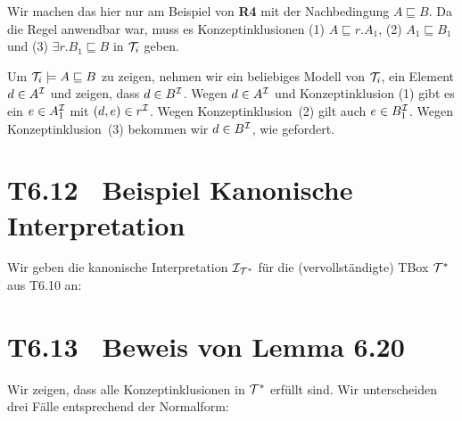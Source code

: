\documentclass[fontsize=11pt, twoside=false, numbers=autoenddot]{scrbook}
\begin{document}
Wir machen das hier nur am Beispiel von \textbf{\textsf{R4}} mit der
Nachbedingung $A\sqsubseteq B$. Da die Regel anwendbar war, muss es
Konzeptinklusionen (1) $A\sqsubseteq r.A_1$, (2) $A_1\sqsubseteq B_1$
und (3) $\exists r.B_1\sqsubseteq B$ in $\mathcal{T}_i$ geben. 

Um $\mathcal{T}_i\models A\sqsubseteq B$ zu zeigen, nehmen wir ein beliebiges
Modell \Imc von $\mathcal{T}_i$, ein Element $d\in A^\mathcal{I}$ und zeigen, dass
$d\in B^\mathcal{I}$. Wegen $d\in A^\mathcal{I}$ und Konzeptinklusion (1) gibt es
ein $e\in A_1^\mathcal{I}$ mit $(d,e)\in r^\mathcal{I}$. Wegen Konzeptinklusion~(2)
gilt auch $e\in B_1^\mathcal{I}$. Wegen Konzeptinklusion~(3) bekommen wir
$d\in B^\mathcal{I}$, wie gefordert. 


\section*{T6.12~ Beispiel Kanonische Interpretation}

Wir geben die kanonische Interpretation $\mathcal{I}_{\mathcal{T}^*}$ für die
(vervollständigte) TBox $\mathcal{T}^*$ aus T6.10 an: 
% 
\begin{center}
\end{center}

\section*{T6.13~ Beweis von Lemma 6.20}

Wir zeigen, dass alle Konzeptinklusionen in $\mathcal{T}^*$ erfüllt sind. Wir
unterscheiden drei Fälle entsprechend der Normalform: 
\end{document}
